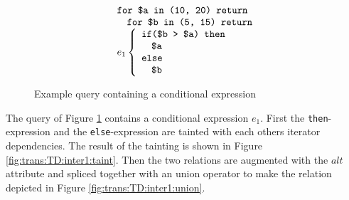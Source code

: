 \begin{myExample}
\begin{figure}[h]
\centering
\begin{equation*}
\begin{array}{l}
\mbox{\texttt{for \$a in (10, 20) return}} \\ \quad
\mbox{\texttt{for \$b in (5, 15) return}} \\ 
e_1 \left\{\begin{array}{l}
           \mbox{\texttt{if(\$b > \$a) then}} \\ \quad
           \mbox{\texttt{\$a}} \\ 
           \mbox{\texttt{else}} \\ \quad
           \mbox{\texttt{\$b}}
           \end{array}\right.
\end{array}
\end{equation*}
\caption{Example query containing a conditional expression \label{fig:trans:TD:condQue}}
\end{figure}

The query of Figure \ref{fig:trans:TD:condQue} contains a conditional expression $e_1$. First the
\texttt{then}-expression and the \texttt{else}-expression are tainted with each
others iterator dependencies. The result of the tainting is shown in Figure \ref{fig:trans:TD:inter1:taint}. Then the two relations are augmented
with the $alt$ attribute and spliced together with an \textsf{union} operator to make the relation depicted in
Figure \ref{fig:trans:TD:inter1:union}.


\end{myExample}
